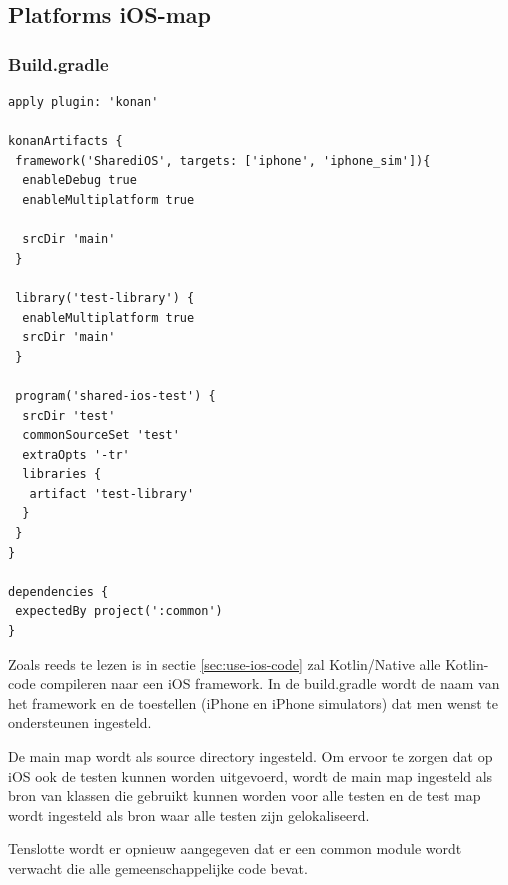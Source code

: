 \subsection{Platforms iOS-map}
\subsubsection{Build.gradle}
\label{sec:ios-build-gradle}
\begin{lstlisting}
apply plugin: 'konan'

konanArtifacts {
 framework('SharediOS', targets: ['iphone', 'iphone_sim']){
  enableDebug true
  enableMultiplatform true

  srcDir 'main'
 }

 library('test-library') {
  enableMultiplatform true
  srcDir 'main'
 }

 program('shared-ios-test') {
  srcDir 'test'
  commonSourceSet 'test'
  extraOpts '-tr'
  libraries {
   artifact 'test-library'
  }
 }
}

dependencies {
 expectedBy project(':common')
}
\end{lstlisting}

Zoals reeds te lezen is in sectie \ref{sec:use-ios-code} zal Kotlin/Native alle Kotlin-code compileren naar een iOS framework. In de build.gradle wordt de naam van het framework en de toestellen (iPhone en iPhone simulators) dat men wenst te ondersteunen ingesteld.

De main map wordt als source directory ingesteld. Om ervoor te zorgen dat op iOS ook de testen kunnen worden uitgevoerd, wordt de main map ingesteld als bron van klassen die gebruikt kunnen worden voor alle testen en de test map wordt ingesteld als bron waar alle testen zijn gelokaliseerd.

Tenslotte wordt er opnieuw aangegeven dat er een common module wordt verwacht die alle gemeenschappelijke code bevat.


